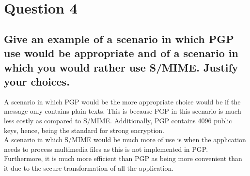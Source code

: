 \documentclass{report}
\begin{document}
	\section{Question 4}
	\startsection
		\renewcommand{\thesubsection}{\thesection.\Alph{subsection}}
		\subsection{Give an example of a scenario in which PGP use would be appropriate and of a scenario in which you would rather use S/MIME. Justify your choices.}
		\startsubsection
			A scenario in which PGP would be the more appropriate choice would be if the message only contains plain texts. This is because PGP in this scenario is much less costly as compared to S/MIME. Additionally, PGP contains 4096 public keys, hence, being the standard for strong encryption. \\
			A scenario in which S/MIME would be much more of use is when the application needs to process multimedia files as this is not implemented in PGP. Furthermore, it is much more efficient than PGP as being more convenient than it due to the secure transformation of all the application.
		\closesection
	\closesection
\end{document}
